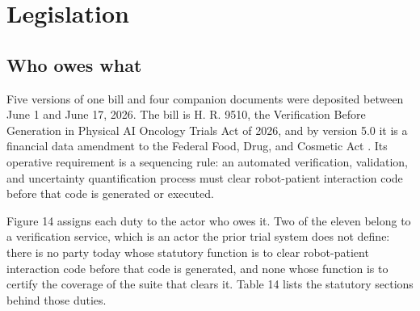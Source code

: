 %
\section{Legislation}
\label{sec:legislation}

\subsection{Who owes what}

Five versions of one bill and four companion documents were deposited between
June 1 and June 17, 2026. The bill is H. R. 9510, the Verification Before
Generation in Physical AI Oncology Trials Act of 2026, and by version 5.0 it is
a financial data amendment to the Federal Food, Drug, and Cosmetic Act
\cite{hr9510billv5}. Its operative requirement is a sequencing rule: an
automated verification, validation, and uncertainty quantification process must
clear robot-patient interaction code before that code is generated or executed.



Figure 14 assigns each duty to the actor who owes it. Two of the eleven belong
to a verification service, which is an actor the prior trial system does not
define: there is no party today whose statutory function is to clear
robot-patient interaction code before that code is generated, and none whose
function is to certify the coverage of the suite that clears it. Table 14 lists
the statutory sections behind those duties.

